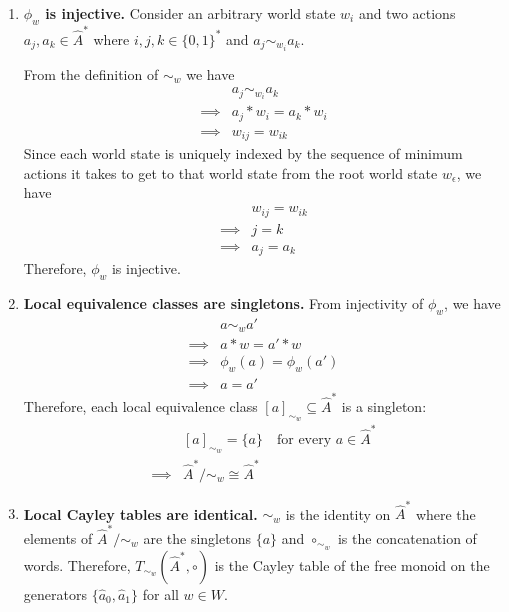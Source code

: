 \begin{proofE}
\begin{enumerate}
\begin{enumerate}
        \item \textbf{$\phi_{w}$ is injective.}
        Consider an arbitrary world state $w_{i}$ and two actions $a_{j}, a_{k} \in \hat{A}^{*}$ where $i,j,k \in \{0,1\}^{*}$ and $a_{j} \sim_{w_{i}} a_{k}$.

        From the definition of $\sim_{w}$ we have
        \begin{align}
            & a_{j} \sim_{w_{i}} a_{k} \\
            \implies & a_{j} \ast w_{i} = a_{k} \ast w_{i} \\
            \implies & w_{ij} = w_{ik}
        \end{align}
        Since each world state is uniquely indexed by the sequence of minimum actions it takes to get to that world state from the root world state $w_{\epsilon}$, we have
        \begin{align}
            & w_{ij} = w_{ik} \\
            \implies & j = k \\
            \implies & a_{j} = a_{k}
        \end{align}
        Therefore, $\phi_{w}$ is injective.

        \item \textbf{Local equivalence classes are singletons.}
        From injectivity of $\phi_{w}$, we have
        \begin{align}
            & a \sim_{w} a' \\
            \implies & a \ast w = a' \ast w \\
            \implies & \phi_{w}(a) = \phi_{w}(a') \\
            \implies & a = a'
        \end{align}
        Therefore, each local equivalence class $[a]_{\sim_{w}} \subseteq \hat{A}^{*}$ is a singleton:
        \begin{align}
            & [a]_{\sim_{w}} = \{a\} \quad \text{for every $a \in \hat{A}^{*}$} \\
            \implies & \hat{A}^{*}/\sim_{w} \cong \hat{A}^{*}
        \end{align}

        \item \textbf{Local Cayley tables are identical.}
        $\sim_{w}$ is the identity on $\hat{A}^{*}$ where the elements of $\hat{A}^{*}/\sim_{w}$ are the singletons $\{a\}$ and $\circ_{\sim_{w}}$ is the concatenation of words.
        Therefore, $T_{\sim_{w}}(\hat{A}^{*}, \circ)$ is the Cayley table of the free monoid on the generators $\{\hat{a}_{0}, \hat{a}_{1}\}$ for all $w \in W$.
    \end{enumerate}
\end{enumerate}
\end{proofE}

